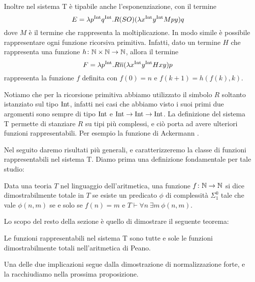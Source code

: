 \documentclass[]{marticle}
\begin{document}
Inoltre nel sistema T \`e tipabile anche l'esponenziazione, con il termine
\[
    E = \lambda p^{\text{Int}} q^{\text{Int}} . R (SO) (\lambda x^{\text{Int}} y^{\text{Int}} Mpy) q
\]
dove $M$ \`e il termine che rappresenta la moltiplicazione. In modo simile \` e
possibile rappresentare ogni funzione ricorsiva primitiva. Infatti, dato un
termine $H$ che rappresenta una funzione $h\colon\mathbb{N}\times\mathbb{N}\rightarrow\mathbb{N}$, allora il
termine
\[
    F = \lambda p^{\text{Int}} . R \overline{n} (\lambda x^{\text{Int}} y^{\text{Int}} Hxy) p
\]
rappresenta la funzione $f$ definita con $f(0) = n$ e $f(k+1) = h(f(k),k)$.

Notiamo che per la ricorsione primitiva abbiamo utilizzato il simbolo $R$
soltanto istanziato sul tipo $\text{Int}$, infatti nei casi che abbiamo visto i suoi
primi due argomenti sono sempre di tipo $\text{Int}$ e $\text{Int}\rightarrow\text{Int}\rightarrow\text{Int}$.
La definizione del sistema T permette di stanziare $R$ su tipi pi\`u complessi,
e ci\`o porta ad avere ulteriori funzioni rappresentabili. Per esempio la
funzione di Ackermann .

Nel seguito daremo risultati pi\`u generali, e caratterizzeremo la classe di
funzioni rappresentabili nel sistema T. Diamo prima una definizione fondamentale
per tale studio:
\begin{block}[Definizione]
    Data una teoria $T$ nel linguaggio dell'aritmetica, una funzione
    $f\colon\mathbb{N}\rightarrow\mathbb{N}$ si dice dimostrabilmente totale in $T$ se esiste un
    predicato $\phi$ di complessit\`a $\Sigma^0_1$ tale che vale $\phi(n,m)$ se
    e solo se $f(n)=m$ e $T\vdash \forall n\ \exists m\ \phi(n,m)$.
\end{block}

Lo scopo del resto della sezione \`e quello di dimostrare il seguente teorema:

\begin{block}[Teorema]
    Le funzioni rappresentabili nel sistema T sono tutte e sole le funzioni
    dimostrabilmente totali nell'aritmetica di Peano.
\end{block}

Una delle due implicazioni segue dalla dimostrazione di normalizzazione forte, e
la racchiudiamo nella prossima proposizione.
\end{document}
